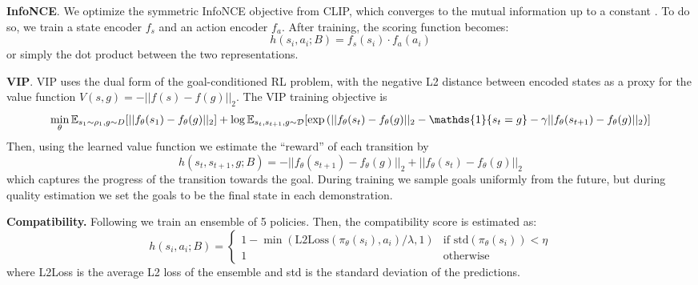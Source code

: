 \vspace{0.075in}
\noindent \textbf{InfoNCE}. We optimize the symmetric InfoNCE objective from CLIP, which converges to the mutual information up to a constant \citep{ma2018noise}. To do so, we train a state encoder $f_s$ and an action encoder $f_a$. After training, the scoring function becomes:
\begin{equation*}
    h(s_i, a_i; B) = f_s(s_i) \cdot f_a(a_i)
\end{equation*}
or simply the dot product between the two representations.

\vspace{0.075in}

\noindent \textbf{VIP}. VIP \citep{ma2023vip} uses the dual form of the goal-conditioned RL problem, with the negative L2 distance between encoded states as a proxy for the value function $V(s,g) = - ||f(s) - f(g)||_2$. The VIP training objective is 
\begin{equation*}
    \min_\theta \E_{s_1 \sim \rho_1, g \sim D}[||f_\theta(s_1) - f_\theta(g)||_2] + \log \E_{s_t, s_{t+1}, g \sim \D}[\exp\left(||f_\theta(s_t) - f_\theta(g)||_2 - \mathds{1}\{s_t = g\} - \gamma ||f_\theta(s_{t+1}) - f_\theta(g)||_2 \right)]
\end{equation*}
Then, using the learned value function we estimate the ``reward'' of each transition by
\begin{equation*}
     h(s_t, s_{t+1}, g; B) = -||f_\theta(s_{t+1}) - f_\theta(g)||_2 + ||f_\theta(s_{t}) - f_\theta(g)||_2
\end{equation*}
which captures the progress of the transition towards the goal. During training we sample goals uniformly from the future, but during quality estimation we set the goals to be the final state in each demonstration.

\vspace{0.075in}
\noindent \textbf{Compatibility.} Following \citet{ghandi2023eliciting} we train an ensemble of 5 policies. Then, the compatibility score is estimated as:
\begin{equation*}
    h(s_i, a_i; B) = \begin{cases}
        1 - \min \left(\text{L2Loss}(\pi_\theta(s_i), a_i) / \lambda, 1 \right) & \text{if} \text{ std}(\pi_\theta(s_i)) < \eta \\
        1 & \text{otherwise}
    \end{cases}
\end{equation*}
where L2Loss is the average L2 loss of the ensemble and std is the standard deviation of the predictions.

